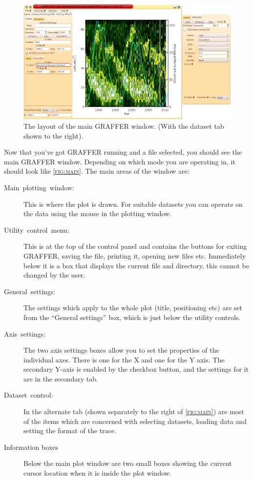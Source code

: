 \documentclass[11pt,twoside,english]{article}
\begin{document}
\begin{figure}[htbp]
  \centering
  \includegraphics[width=\textwidth]{main}
  \caption{The layout of the main GRAFFER window. (With the dataset tab
    shown to the right).}
  \label{fig:main}
\end{figure}
Now that you've got GRAFFER running and a file selected, you should see
the main GRAFFER window. Depending on which mode you are operating in,
it should look like \textsc{\autoref{fig:main}}.  The main areas of the
window are:

\begin{description}
\item [Main~plotting~window:]This is where the plot is drawn. For
  suitable datasets you can operate on the data using the mouse in the
  plotting window.
\item [Utility~control~menu:]This is at the top of the control panel
  and contains the buttons for exiting GRAFFER, saving the file,
  printing it, opening new files etc. Immediately below it is a box
  that displays the current file and directory, this cannot be changed
  by the user.
\item [General~settings:]The settings which apply to the whole plot
  (title, positioning etc) are set from the {}``General settings'' box,
  which is just below the utility controls.
\item [Axis~settings:]The two axis settings boxes allow you to set the
  properties of the individual axes. There is one for the X and one for
  the Y axis. The secondary Y-axis is enabled by the checkbox button,
  and the settings for it are in the secondary tab.
\item [Dataset~control:]In the alternate tab (shown separately to the
  right of \textsc{\autoref{fig:main}}) are most of the items which are
  concerned with selecting datasets, loading data and setting the
  format of the trace.

\item[Information boxes] Below the main plot window are two small boxes
  showing the current cursor location when it is inside the plot window.

\end{description}
\end{document}
